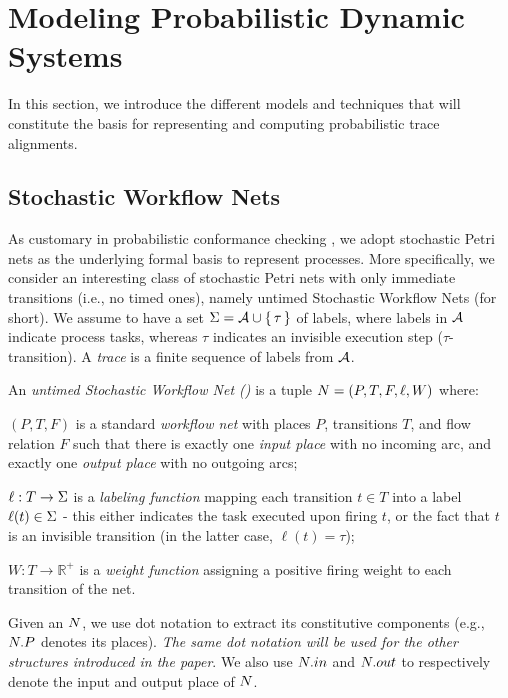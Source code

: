 
\section{Modeling Probabilistic Dynamic Systems}
\label{sec:models}
In this section, we introduce the different models and techniques that will constitute the basis for representing and computing probabilistic trace alignments.

\subsection{Stochastic Workflow Nets}\label{subsec:spn}
As customary in probabilistic conformance checking \cite{DBLP:conf/bpm/LeemansSA19,DBLP:conf/icpm/PolyvyanyyK19,DBLP:journals/tosem/PolyvyanyySWCM20}, we adopt stochastic Petri nets \cite{MarsanCB84,RoggeSoltiAW13} as the underlying formal basis to represent processes. More specifically, we consider an interesting class of stochastic Petri nets with only immediate transitions (i.e., no timed ones), namely untimed Stochastic Workflow Nets (\uswn for short).
We assume to have a set $\Sigma = \mathcal{A} \cup \set{\tau}$ of labels, where labels in $\mathcal{A}$ indicate process tasks, whereas $\tau$ indicates an invisible execution step ($\tau$-transition). A \emph{trace} is a finite sequence of labels from $\mathcal{A}$.

\begin{definition} An \emph{untimed Stochastic Workflow Net (\uswn)}
is a tuple $N = (P,T,F,\ell,W)$ where:
\begin{compactitem}
\item $(P,T,F)$ is a standard \emph{workflow net} with places $P$, transitions $T$, and flow relation $F$ such that there is exactly one \emph{input place} with no incoming arc, and exactly one \emph{output place} with no outgoing arcs;
\item $\ell: T \rightarrow \Sigma$ is a \emph{labeling function} mapping each transition $t \in T$ into a label $\ell(t) \in \Sigma$ - this either indicates the task executed upon firing $t$, or the fact that $t$ is an invisible transition (in the latter case, $\ell(t) = \tau$);
\item $W\colon T\to \mathbb{R}^+$ is a \emph{weight function} assigning a positive firing weight to each transition of the net.
\end{compactitem}
\end{definition}
Given an \uswn $N$, we use dot notation to extract its constitutive components (e.g., $N.P$ denotes its places). \emph{The same dot notation will be used for the other structures introduced in the paper}. We also use $N.in$ and $N.out$ to respectively denote the input and output place of $N$.

